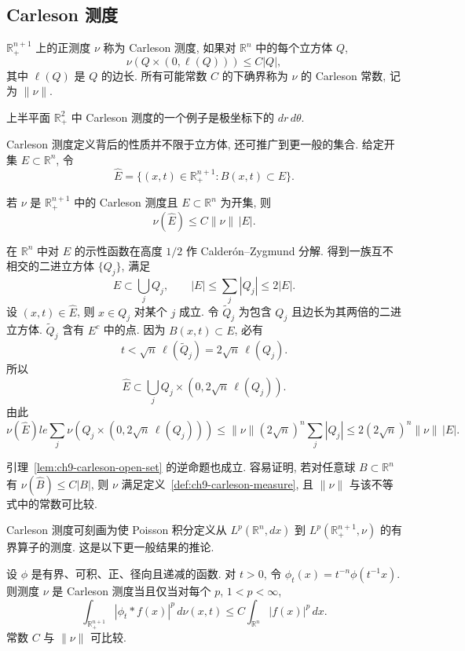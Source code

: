 \subsection{Carleson 测度}
\label{sec:ch9-carleson-measures}

\begin{Definition}
\label{def:ch9-carleson-measure}
$\mathbb R_+^{n+1}$ 上的正测度 $\nu$ 称为 Carleson 测度, 如果对 $\mathbb R^n$ 中的每个立方体 $Q$,
\[
 \nu(Q\times(0,\ell(Q)))\le C|Q|,
\]
其中 $\ell(Q)$ 是 $Q$ 的边长. 所有可能常数 $C$ 的下确界称为 $\nu$ 的 Carleson 常数, 记为 $\|\nu\|$.
\end{Definition}

\hypertarget{chapter-09-page-210}{}
上半平面 $\mathbb R_+^2$ 中 Carleson 测度的一个例子是极坐标下的 $dr\,d\theta$.

Carleson 测度定义背后的性质并不限于立方体, 还可推广到更一般的集合. 给定开集 $E\subset\mathbb R^n$, 令
\[
 \widehat E=\{(x,t)\in\mathbb R_+^{n+1}:B(x,t)\subset E\}.
\]

\begin{Lemma}
\label{lem:ch9-carleson-open-set}
若 $\nu$ 是 $\mathbb R_+^{n+1}$ 中的 Carleson 测度且 $E\subset\mathbb R^n$ 为开集, 则
\[
 \nu(\widehat E)\le C\|\nu\|\,|E|.
\]
\end{Lemma}

\begin{Proof}
在 $\mathbb R^n$ 中对 $E$ 的示性函数在高度 $1/2$ 作 Calderón--Zygmund 分解. 得到一族互不相交的二进立方体 $\{Q_j\}$, 满足
\[
 E\subset\bigcup_jQ_j,
 \qquad
 |E|\le\sum_j|Q_j|\le2|E|.
\]
设 $(x,t)\in\widehat E$, 则 $x\in Q_j$ 对某个 $j$ 成立. 令 $\widetilde Q_j$ 为包含 $Q_j$ 且边长为其两倍的二进立方体. $\widetilde Q_j$ 含有 $E^c$ 中的点. 因为 $B(x,t)\subset E$, 必有
\[
 t<\sqrt n\,\ell(\widetilde Q_j)=2\sqrt n\,\ell(Q_j).
\]
所以
\[
 \widehat E\subset\bigcup_jQ_j\times(0,2\sqrt n\,\ell(Q_j)).
\]
由此
\[
 \nu(\widehat E)le\sum_j\nu(Q_j\times(0,2\sqrt n\,\ell(Q_j)))
 \le\|\nu\|(2\sqrt n)^n\sum_j|Q_j|
 \le2(2\sqrt n)^n\|\nu\|\,|E|.
\]
\end{Proof}

引理~\ref{lem:ch9-carleson-open-set} 的逆命题也成立. 容易证明, 若对任意球 $B\subset\mathbb R^n$ 有 $\nu(\widehat B)\le C|B|$, 则 $\nu$ 满足定义~\ref{def:ch9-carleson-measure}, 且 $\|\nu\|$ 与该不等式中的常数可比较.

Carleson 测度可刻画为使 Poisson 积分定义从 $L^p(\mathbb R^n,dx)$ 到 $L^p(\mathbb R_+^{n+1},\nu)$ 的有界算子的测度. 这是以下更一般结果的推论.

\begin{Theorem}
\label{thm:ch9-carleson-convolution-characterization}
设 $\phi$ 是有界、可积、正、径向且递减的函数. 对 $t>0$, 令 $\phi_t(x)=t^{-n}\phi(t^{-1}x)$. 则测度 $\nu$ 是 Carleson 测度当且仅当对每个 $p$, $1<p<\infty$,
\begin{equation}
 \int_{\mathbb R_+^{n+1}}|\phi_t*f(x)|^p\,d\nu(x,t)
 \le C\int_{\mathbb R^n}|f(x)|^p\,dx.
 \label{eq:ch9-carleson-embedding}
\end{equation}
常数 $C$ 与 $\|\nu\|$ 可比较.
\end{Theorem}

